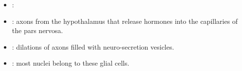 \begin{multicols}{2}
\begin{itemize}
  \begin{center}
  \end{center}

  \item {}:
  
  \begin{center}
  \end{center}
  
  \item {}: axons from the hypothalamus that release hormones into the capillaries of the pars nervosa. 
  
  \begin{center}
  \end{center}
  
  \item {}: dilations of axons filled with neuro-secretion vesicles.
  
  \begin{center}
  \end{center}

  \item {}: most nuclei belong to these glial cells.
  
  \begin{center}
  \end{center}
  
  
\end{itemize}
\end{multicols}


